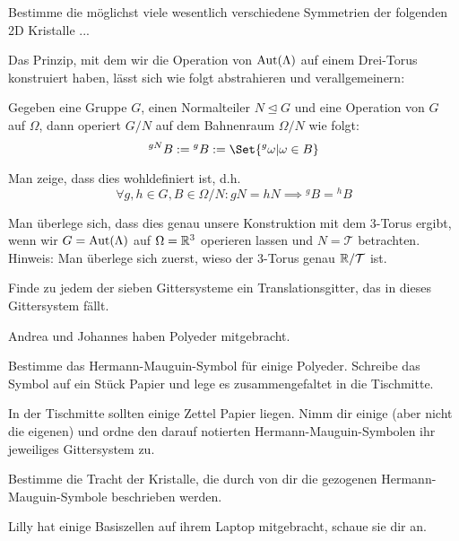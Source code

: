 \begin{sheet}

\begin{problem}
Bestimme die möglichst viele wesentlich verschiedene Symmetrien der folgenden 2D Kristalle ...
\end{problem}

\begin{problem}[difficulty={fortgeschritten}]
Das Prinzip, mit dem wir die Operation von $\operatorname{Aut}(\Lambda)$ auf einem Drei-Torus konstruiert haben, lässt sich wie folgt abstrahieren und verallgemeinern:

Gegeben eine Gruppe $G$, einen Normalteiler $N\unlhd G$ und eine Operation von $G$ auf $\Omega$, dann operiert $G/N$ auf dem Bahnenraum $\Omega/N$ wie folgt:
\[{^{gN} B} := {^g B} := \Set{{^g \omega} | \omega\in B}\]
\begin{subproblem}[difficulty={einfach}]
Man zeige, dass dies wohldefiniert ist, d.h.
\[\forall g,h\in G, B\in\Omega/N: gN=hN \implies {^g B} = {^h B}\]
\end{subproblem}
\begin{subproblem}[difficulty={mittel}]
Man überlege sich, dass dies genau unsere Konstruktion mit dem 3-Torus ergibt, wenn wir $G=\operatorname{Aut}(\Lambda)$ auf $\Omega=\mathbb{R}^3$ operieren lassen und $N=\mathcal{T}$ betrachten. Hinweis: Man überlege sich zuerst, wieso der 3-Torus genau $\mathbb{R} / \mathcal{T}$ ist.
\end{subproblem}
\end{problem}

\begin{problem}[difficulty={leicht bis mittel}]
Finde zu jedem der sieben Gittersysteme ein Translationsgitter, das in dieses Gittersystem fällt.
\end{problem}

\begin{problem}
	Andrea und Johannes haben Polyeder mitgebracht. 
	\begin{subproblem}
		Bestimme das Hermann-Mauguin-Symbol für einige Polyeder. Schreibe das Symbol auf ein Stück Papier und lege es zusammengefaltet in die Tischmitte.
	\end{subproblem}
	\begin{subproblem}
		In der Tischmitte sollten einige Zettel Papier liegen. Nimm dir einige (aber nicht die eigenen) und ordne den darauf notierten Hermann-Mauguin-Symbolen ihr jeweiliges Gittersystem zu.
	\end{subproblem}
	\begin{subproblem}[difficulty={mittel}]
		Bestimme die Tracht der Kristalle, die durch von dir die gezogenen Hermann-Mauguin-Symbole beschrieben werden.
	\end{subproblem}
	
\end{problem}
\begin{problem}[difficulty={sehr leicht}]
	Lilly hat einige Basiszellen auf ihrem Laptop mitgebracht, schaue sie dir an.
\end{problem}


\end{sheet}